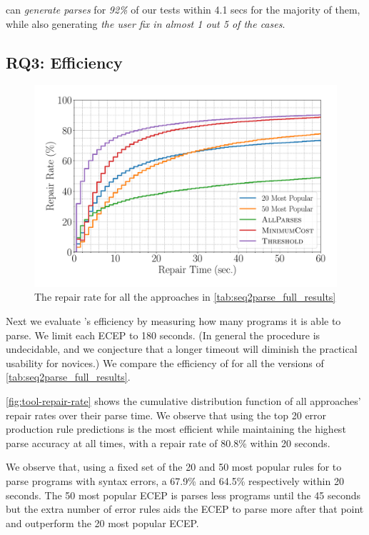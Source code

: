 \begin{framed}
  \noindent \toolname can \emph{generate parses} for \emph{92\%} of our tests
  within 4.1 secs for the majority of them, while also generating \emph{the user
  fix in almost 1 out 5 of the cases}.
\end{framed}

\subsection{RQ3: Efficiency}
\label{sec:eval:efficiency}

\begin{figure}[t]
  \centering
  \includegraphics[width=0.8\linewidth]{tool-repair-rate.pdf}
  \caption{The repair rate for all the approaches in
  \autoref{tab:seq2parse_full_results}}
  \label{fig:tool-repair-rate}
\end{figure}

Next we evaluate \toolname's efficiency by measuring how many programs it is
able to parse. We limit each ECEP to 180 seconds. (In general the procedure is
undecidable, and we conjecture that a longer timeout will diminish the practical
usability for novices.) We compare the efficiency of \toolname for all the
versions of \autoref{tab:seq2parse_full_results}.

\autoref{fig:tool-repair-rate} shows the cumulative distribution function of all
\toolname approaches' repair rates over their parse time. We observe that using
the top 20 error production rule predictions is the most efficient while
maintaining the highest parse accuracy at all times, with a repair rate of
80.8\% within 20 seconds.

We observe that, using a fixed set of the 20 and 50 most popular rules for
\toolname to parse programs with syntax errors, a 67.9\% and 64.5\% respectively
within 20 seconds. The 50 most popular ECEP is parses less programs until the 45
seconds but the extra number of error rules aids the ECEP to parse more after
that point and outperform the 20 most popular ECEP.

